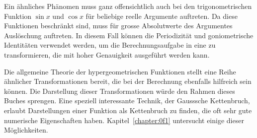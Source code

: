 Ein ähnliches Phänomen muss ganz offensichtlich auch bei den
trigonometrischen Funktion $\sin x$ und $\cos x$ für beliebige
reelle Argumente auftreten.
Da diese Funktionen beschränkt sind, muss für grosse Absolutwerte
des Argumentes Auslöschung auftreten.
%
In diesem Fall können die Periodizität und goniometrische
%
Identitäten verwendet werden, um die Berechnungsaufgabe in eine zu
transformieren, die mit hoher Genauigkeit ausgeführt werden kann.

Die allgemeine Theorie der hypergeometrischen Funktionen stellt
eine Reihe ähnlicher Transformationen bereit, die bei der Berechnung
ebenfalls hilfreich sein können.
Die Darstellung dieser Transformationen würde den Rahmen dieses
Buches sprengen.
Eine speziell interessante Technik, der Gausssche Kettenbruch,
%
%
erlaubt Darstellungen einer Funktion als Kettenbruch zu finden, die
oft sehr gute numerische Eigenschaften haben.
Kapitel~\ref{chapter:0f1} untersucht einige dieser Möglichkeiten.


